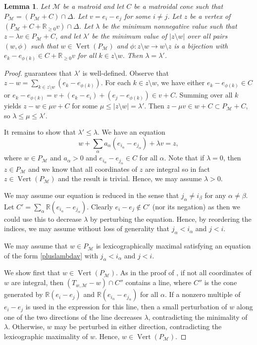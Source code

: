 \documentclass[12pt]{amsart}
\newcommand{\mb}{\mathbb}
\newcommand{\MM}{{\mathcal M}}
\newcommand{\Vt}{{\operatorname{Vert}}}
\theoremstyle{plain}
\newtheorem{Lem}[Thm]{Lemma}
\theoremstyle{definition}
\theoremstyle{remark}
\begin{document}
\begin{Lem} \label{lambdalambdaprime}
Let $\MM$ be a matroid and let $C$ be a matroidal cone such that $P_\MM = (P_\MM + C) \cap \Delta$. Let $v=e_i-e_j$ for some $i \ne j$. Let $z$ be a vertex of $(P_\MM+C+\mb{R}_{\ge 0}v)\cap \Delta$. Let $\lambda$ be the minimum nonnegative value such that $z - \lambda v \in P_\MM + C$, and let $\lambda'$ be the minimum value of $|z \setminus w|$ over all pairs $(w, \phi)$ such that $w \in \Vt(P_\MM)$ and $\phi: z \setminus w \to w \setminus z$ is a bijection with $e_k-e_{\phi(k)} \in C+\mb{R}_{\ge 0}v$ for all $k \in z \setminus w$. Then $\lambda = \lambda'$.
\end{Lem}

\begin{proof}
 guarantees that $\lambda'$ is well-defined. Observe that $z - w = \sum_{k \in z \setminus w} (e_k - e_{\phi(k)})$. For each $k \in z \setminus w$, we have either $e_k - e_{\phi(k)} \in C$ or $e_k - e_{\phi(k)} = v + (e_k - e_i) + (e_j - e_{\phi(k)}) \in v + C$. Summing over all $k$ yields $z - w \in \mu v + C$ for some $\mu \leq |z \setminus w| = \lambda'$. Then $z - \mu v \in w + C \subset P_\MM + C$, so $\lambda \leq \mu \leq \lambda'$.

It remains to show that $\lambda' \leq \lambda$. We have an equation
\begin{equation}\label{pluslambdav}
w+\sum_{\alpha} a_{\alpha}(e_{i_\alpha}-e_{j_\alpha})+\lambda v=z,
\end{equation} 
where $w \in P_\MM$ and $a_\alpha>0$ and $e_{i_\alpha}-e_{j_\alpha} \in C$ for all $\alpha$. Note that if $\lambda=0$, then $z\in P_\MM$ and we know that all coordinates of $z$ are integral so in fact $z \in \Vt(P_\MM)$ and the result is trivial. Hence, we may assume $\lambda>0$.

We may assume our equation is reduced in the sense that $j_{\alpha}\ne i_\beta$ for any $\alpha \ne \beta$. Let $C'=\sum_\alpha \mb{R}(e_{i_\alpha}-e_{j_\alpha})$. Clearly $e_i-e_j \not \in C'$ (nor its negation) as then we could use this to decrease $\lambda$ by perturbing the equation. Hence, by reordering the indices, we may assume without loss of generality that $j_\alpha < i_\alpha$ and $j < i$.

We may assume that $w \in P_\MM$ is lexicographically maximal satisfying an equation of the form \eqref{pluslambdav} with $j_\alpha < i_\alpha$ and $j < i$. 

We show first that $w\in \Vt(P_\MM)$. As in the proof of , if not all coordinates of $w$ are integral, then $(T_{w,\MM}-w)\cap C''$ contains a line, where $C''$ is the cone generated by $\mb{R}(e_i-e_j)$ and $\mb{R}(e_{i_\alpha}-e_{j_\alpha})$ for all $\alpha$. If a nonzero multiple of $e_i-e_j$ is used in the expression for this line, then a small perturbation of $w$ along one of the two directions of the line decreases $\lambda$, contradicting the minimality of $\lambda$. Otherwise, $w$ may be perturbed in either direction, contradicting the lexicographic maximality of $w$. Hence, $w \in \Vt(P_\MM)$.


\end{proof}
\end{document}
